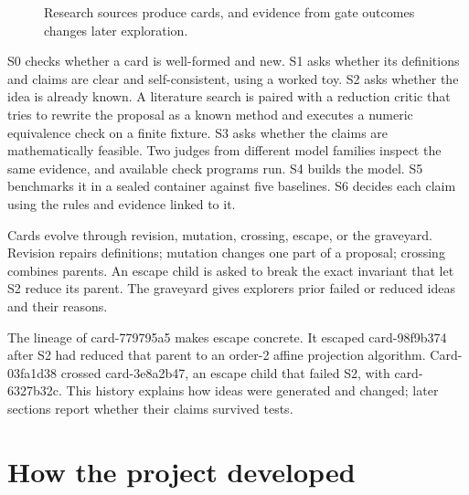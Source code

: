 \begin{figure}[ht]
\centering
{}
\caption{Research sources produce cards, and evidence from gate outcomes changes later exploration.}
\label{fig:loop}
\end{figure}

S0 checks whether a card is well-formed and new. S1 asks whether its definitions and claims are clear and self-consistent, using a worked toy. S2 asks whether the idea is already known. A literature search is paired with a reduction critic that tries to rewrite the proposal as a known method and executes a numeric equivalence check on a finite fixture. S3 asks whether the claims are mathematically feasible. Two judges from different model families inspect the same evidence, and available check programs run. S4 builds the model. S5 benchmarks it in a sealed container against five baselines. S6 decides each claim using the rules and evidence linked to it.

Cards evolve through revision, mutation, crossing, escape, or the graveyard. Revision repairs definitions; mutation changes one part of a proposal; crossing combines parents. An escape child is asked to break the exact invariant that let S2 reduce its parent. The graveyard gives explorers prior failed or reduced ideas and their reasons.

The lineage of card-779795a5 makes escape concrete. It escaped card-98f9b374 after S2 had reduced that parent to an order-2 affine projection algorithm. Card-03fa1d38 crossed card-3e8a2b47, an escape child that failed S2, with card-6327b32c. This history explains how ideas were generated and changed; later sections report whether their claims survived tests.

\section{How the project developed}




